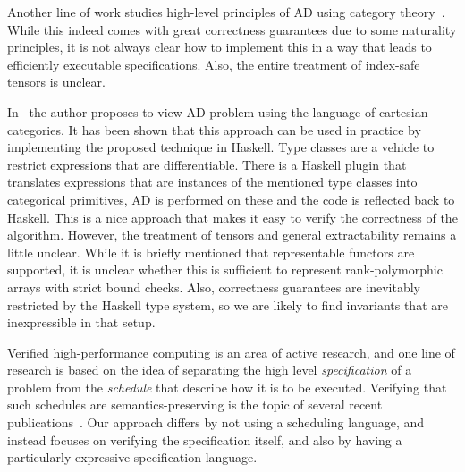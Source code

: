 Another line of work studies high-level principles of AD using
category theory~\cite{ad-theor1, ad-theor2, ad-theor3}.
While this indeed comes with great correctness guarantees due to
some naturality principles, it is not always clear how to implement
this in a way that leads to efficiently executable specifications.  Also, the
entire treatment of index-safe tensors is unclear.

In~\cite{ad-elliott} the author proposes to view AD problem using
the language of cartesian categories.  It has been shown that
this approach can be used in practice by implementing the proposed
technique in Haskell.  Type classes are a vehicle to restrict expressions
that are differentiable.  There is a Haskell plugin that translates
expressions that are instances of the mentioned type classes into
categorical primitives, AD is performed on these and the code is reflected
back to Haskell.  This is a nice approach that makes it easy
to verify the correctness of the algorithm.  However, the treatment
of tensors and general extractability remains a little unclear.
While it is briefly mentioned that representable functors
are supported, it is unclear whether this is sufficient to
represent rank-polymorphic arrays with strict bound checks.
Also, correctness guarantees are inevitably restricted by the
Haskell type system, so we are likely to find invariants that
are inexpressible in that setup.

Verified high-performance computing is an area of active research, and
one line of research is based on the idea of separating the high level
\emph{specification} of a problem from the \emph{schedule} that
describe how it is to be executed. Verifying that such schedules are
semantics-preserving is the topic of several recent
publications~\cite{10.1145/3527328,10.1145/3498717}. Our approach
differs by not using a scheduling language, and instead focuses on
verifying the specification itself, and also by having a particularly
expressive specification language.
